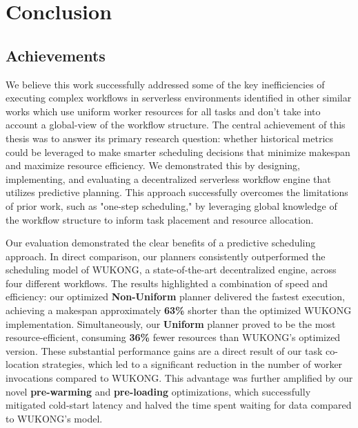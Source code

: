 \chapter{Conclusion}
\label{chap:conclusion}
\chaptoc
\bigskip

\section{Achievements}

We believe this work successfully addressed some of the key inefficiencies of executing complex workflows in serverless environments identified in other similar works which use uniform worker resources for all tasks and don't take into account a global-view of the workflow structure. The central achievement of this thesis was to answer its primary research question: whether historical metrics could be leveraged to make smarter scheduling decisions that minimize makespan and maximize resource efficiency. We demonstrated this by designing, implementing, and evaluating a decentralized serverless workflow engine that utilizes predictive planning. This approach successfully overcomes the limitations of prior work, such as "one-step scheduling," by leveraging global knowledge of the workflow structure to inform task placement and resource allocation.

Our evaluation demonstrated the clear benefits of a predictive scheduling approach. In direct comparison, our planners consistently outperformed the scheduling model of WUKONG, a state-of-the-art decentralized engine, across four different workflows. The results highlighted a combination of speed and efficiency: our optimized \textbf{Non-Uniform} planner delivered the fastest execution, achieving a makespan approximately \textbf{63\%} shorter than the optimized WUKONG implementation. Simultaneously, our \textbf{Uniform} planner proved to be the most resource-efficient, consuming \textbf{36\%} fewer resources than WUKONG's optimized version. These substantial performance gains are a direct result of our task co-location strategies, which led to a significant reduction in the number of worker invocations compared to WUKONG. This advantage was further amplified by our novel \textbf{pre-warming} and \textbf{pre-loading} optimizations, which successfully mitigated cold-start latency and halved the time spent waiting for data compared to WUKONG's model.

